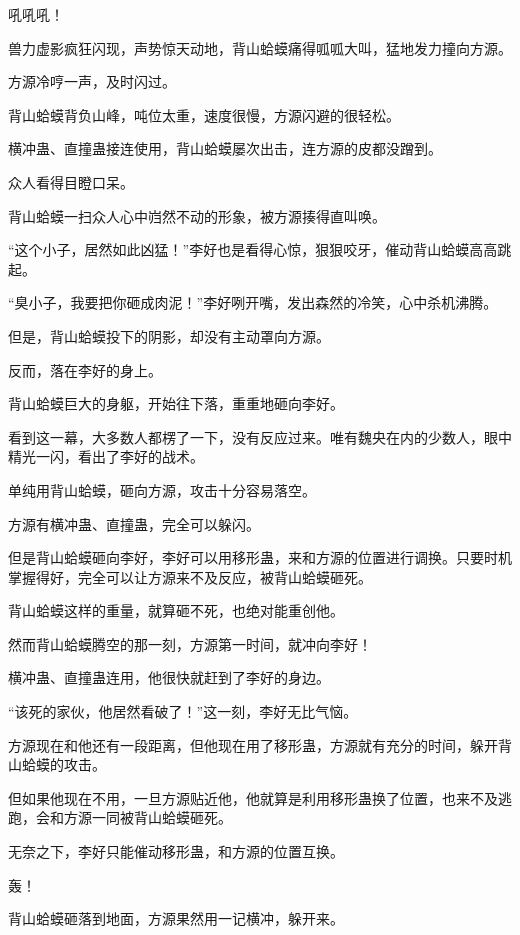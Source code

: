 
\begin{this_body}

吼吼吼！

兽力虚影疯狂闪现，声势惊天动地，背山蛤蟆痛得呱呱大叫，猛地发力撞向方源。

方源冷哼一声，及时闪过。

背山蛤蟆背负山峰，吨位太重，速度很慢，方源闪避的很轻松。

横冲蛊、直撞蛊接连使用，背山蛤蟆屡次出击，连方源的皮都没蹭到。

众人看得目瞪口呆。

背山蛤蟆一扫众人心中岿然不动的形象，被方源揍得直叫唤。

“这个小子，居然如此凶猛！”李好也是看得心惊，狠狠咬牙，催动背山蛤蟆高高跳起。

“臭小子，我要把你砸成肉泥！”李好咧开嘴，发出森然的冷笑，心中杀机沸腾。

但是，背山蛤蟆投下的阴影，却没有主动罩向方源。

反而，落在李好的身上。

背山蛤蟆巨大的身躯，开始往下落，重重地砸向李好。

看到这一幕，大多数人都楞了一下，没有反应过来。唯有魏央在内的少数人，眼中精光一闪，看出了李好的战术。

单纯用背山蛤蟆，砸向方源，攻击十分容易落空。

方源有横冲蛊、直撞蛊，完全可以躲闪。

但是背山蛤蟆砸向李好，李好可以用移形蛊，来和方源的位置进行调换。只要时机掌握得好，完全可以让方源来不及反应，被背山蛤蟆砸死。

背山蛤蟆这样的重量，就算砸不死，也绝对能重创他。

然而背山蛤蟆腾空的那一刻，方源第一时间，就冲向李好！

横冲蛊、直撞蛊连用，他很快就赶到了李好的身边。

“该死的家伙，他居然看破了！”这一刻，李好无比气恼。

方源现在和他还有一段距离，但他现在用了移形蛊，方源就有充分的时间，躲开背山蛤蟆的攻击。

但如果他现在不用，一旦方源贴近他，他就算是利用移形蛊换了位置，也来不及逃跑，会和方源一同被背山蛤蟆砸死。

无奈之下，李好只能催动移形蛊，和方源的位置互换。

轰！

背山蛤蟆砸落到地面，方源果然用一记横冲，躲开来。


\end{this_body}
